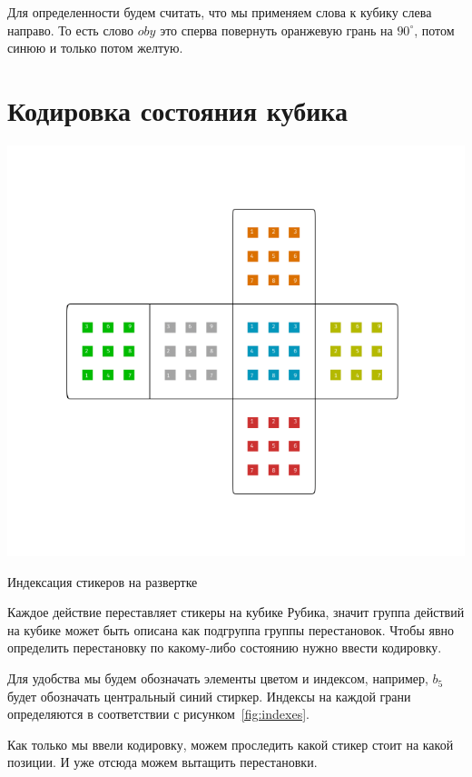\documentclass[a4paper, oneside]{book}
\begin{document}
Для определенности будем считать, что мы применяем слова к кубику слева
направо. То есть слово $oby$ это сперва повернуть оранжевую грань на
$90^\circ$, потом синюю и только потом желтую.

\section{Кодировка состояния кубика}
\begin{marginfigure}
    \includegraphics[width=1.1\columnwidth]{../pics/rubik_index_involute.pdf}
    \caption{Индексация стикеров на развертке}
    \label{fig:indexes}
\end{marginfigure}

Каждое действие переставляет стикеры на кубике Рубика, значит группа действий
на кубике может быть описана как подгруппа группы перестановок. Чтобы явно
определить перестановку по какому-либо состоянию нужно ввести
кодировку.

Для удобства мы будем обозначать элементы цветом и индексом, например, $b_5$
будет обозначать центральный синий стиркер. Индексы на каждой грани
определяются в соответствии с рисунком~\ref{fig:indexes}.

Как только мы ввели кодировку, можем проследить какой стикер стоит на какой позиции. И уже отсюда можем вытащить перестановки.
\end{document}

